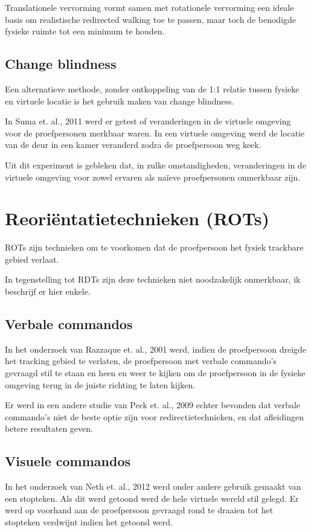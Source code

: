 Translationele vervorming vormt samen met rotationele vervorming een ideale basis 
om realistische redirected walking toe te passen, maar toch de benodigde fysieke 
ruimte tot een minimum te houden.


\subsection{Change blindness}
Een alternatieve methode, zonder ontkoppeling van de 1:1 relatie tussen fysieke 
en virtuele locatie is het gebruik maken van change blindness.

In Suma et. al., 2011 \cite{suma11} werd er getest of veranderingen in de 
virtuele omgeving voor de proefpersonen merkbaar waren. In een virtuele omgeving 
werd de locatie van de deur in een kamer veranderd zodra de proefpersoon weg 
keek.

Uit dit experiment is gebleken dat, in zulke omstandigheden, veranderingen in de
virtuele omgeving voor zowel ervaren als na\"ieve proefpersonen onmerkbaar zijn.


\section{Reori\"entatietechnieken (ROTs)}
ROTs zijn technieken om te voorkomen dat de proefpersoon het fysiek trackbare 
gebied verlaat.

In tegenstelling tot RDTs zijn deze technieken niet noodzakelijk onmerkbaar, ik
beschrijf er hier enkele.


\subsection{Verbale commandos}
In het onderzoek van Razzaque et. al., 2001 \cite{kohn01} werd, indien de
proefpersoon dreigde het tracking gebied te verlaten, de proefpersoon met verbale
commando's gevraagd stil te staan en heen en weer te kijken om de proefpersoon in
de fysieke omgeving terug in de juiste richting te laten kijken.

Er werd in een andere studie van Peck et. al., 2009 \cite{peck09} echter bevonden 
dat verbale commando's niet de beste optie zijn voor redirectietechnieken, en dat
afleidingen betere resultaten geven.


\subsection{Visuele commandos}
In het onderzoek van Neth et. al., 2012 \cite{neth12} werd onder andere gebruik 
gemaakt van een stopteken. Als dit werd getoond werd de hele virtuele wereld stil 
gelegd. Er werd op voorhand aan de proefpersoon gevraagd rond te draaien tot het 
stopteken verdwijnt indien het getoond werd.

